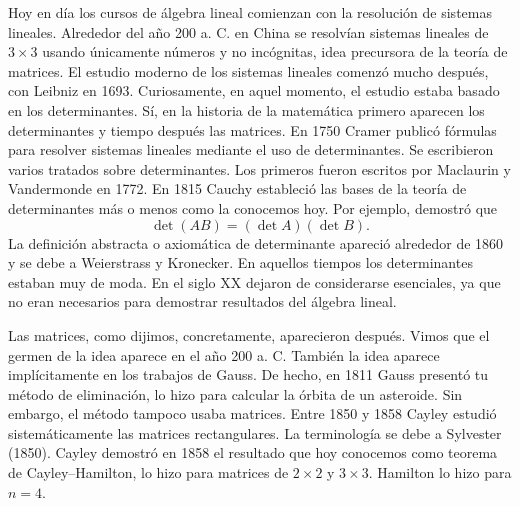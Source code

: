 Hoy en día los cursos de álgebra lineal comienzan con la resolución de sistemas lineales. 
Alrededor del año 200 a. C. en China se resolvían sistemas lineales de $3\times 3$ 
usando únicamente números y no incógnitas, idea precursora de la teoría de matrices. El estudio
moderno de los sistemas lineales comenzó mucho después, con Leibniz en 1693. Curiosamente,
en aquel momento, el estudio estaba basado en los determinantes. Sí, en la historia de la matemática primero aparecen  
los determinantes y tiempo después las matrices. En 1750 Cramer publicó fórmulas
para resolver sistemas lineales mediante el uso de determinantes. Se escribieron varios tratados sobre determinantes. Los primeros fueron escritos por Maclaurin y Vandermonde en 1772. En 1815 Cauchy  
estableció las bases de la teoría de determinantes más o menos como la conocemos hoy. Por ejemplo, demostró que 
\[
\det(AB)=(\det A)(\det B).
\]
La definición abstracta o axiomática de determinante apareció alrededor de 1860 y 
se debe a Weierstrass 
y Kronecker. En aquellos tiempos los determinantes estaban muy de moda. En el siglo XX 
dejaron de considerarse esenciales, ya que no eran necesarios para demostrar
resultados del álgebra lineal. 

Las matrices, como dijimos, concretamente, aparecieron después. Vimos que el germen 
de la idea aparece en el año 200 a. C. También la idea aparece implícitamente en los trabajos de Gauss. De hecho, en 1811 Gauss presentó tu método de eliminación, 
lo hizo para calcular la órbita de un asteroide. Sin embargo, el método
tampoco usaba matrices. Entre 1850 y 1858 Cayley estudió sistemáticamente las
matrices rectangulares. La terminología se debe a Sylvester (1850). Cayley 
demostró en 1858 el resultado que hoy conocemos como teorema de Cayley--Hamilton, lo hizo 
para matrices de $2\times 2$ y $3\times 3$. Hamilton lo hizo para $n=4$.

